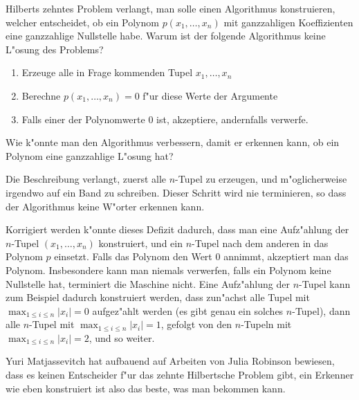 Hilberts zehntes Problem verlangt, man solle einen Algorithmus
konstruieren, welcher entscheidet, ob ein Polynom $p(x_1,\dots,x_n)$
mit ganzzahligen
Koeffizienten eine ganzzahlige Nullstelle habe. Warum ist der folgende
Algorithmus keine L"osung des Problems?
\begin{enumerate}
\item Erzeuge alle in Frage kommenden Tupel $x_1,\dots,x_n$
\item Berechne $p(x_1,\dots,x_n)=0$ f"ur diese Werte der Argumente
\item Falls einer der Polynomwerte $0$ ist, akzeptiere, andernfalls
verwerfe.
\end{enumerate}
Wie k"onnte man den Algorithmus verbessern, damit er erkennen kann,
ob ein Polynom eine ganzzahlige L"osung hat?

\begin{loesung}
Die Beschreibung verlangt, zuerst alle $n$-Tupel zu erzeugen,
und m"oglicherweise irgendwo auf ein Band zu schreiben. Dieser
Schritt wird nie terminieren, so dass der Algorithmus keine
W"orter erkennen kann.

Korrigiert werden k"onnte dieses Defizit dadurch, dass man eine
Aufz"ahlung der $n$-Tupel $(x_1,\dots,x_n)$ konstruiert, und ein
$n$-Tupel nach dem anderen in das Polynom $p$
einsetzt. Falls das Polynom den Wert $0$ annimmt, akzeptiert man
das Polynom. Insbesondere kann man niemals verwerfen, falls
ein Polynom keine Nullstelle hat, terminiert die Maschine nicht.
Eine Aufz"ahlung der $n$-Tupel kann zum Beispiel dadurch konstruiert
werden, dass zun"achst alle Tupel mit
$\max_{1\le i\le n}|x_i|=0$
aufgez"ahlt werden (es gibt genau ein solches $n$-Tupel),
dann alle $n$-Tupel mit
$\max_{1\le i\le n}|x_i|=1$,
gefolgt von den $n$-Tupeln mit
$\max_{1\le i\le n}|x_i|=2$, und so weiter.

Yuri Matjassevitch hat aufbauend auf Arbeiten von Julia Robinson bewiesen,
dass es
keinen Entscheider f"ur das zehnte Hilbertsche Problem gibt,
ein Erkenner wie eben konstruiert ist also das beste, was
man bekommen kann.
\end{loesung}
